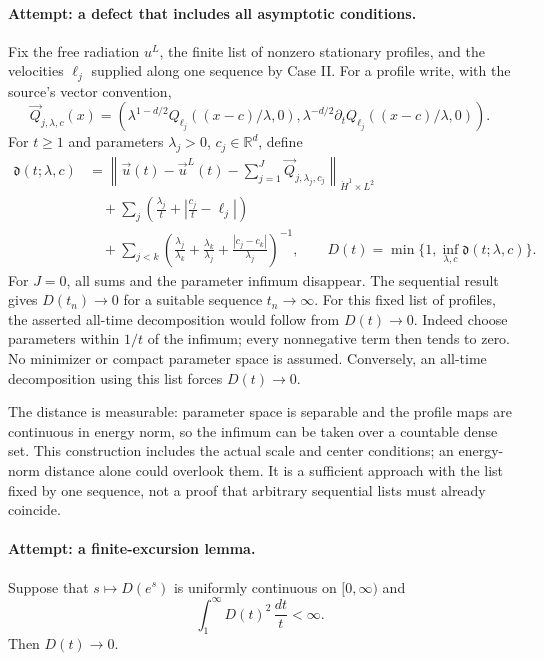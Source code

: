 \documentclass[11pt,a4paper]{article}
\newcommand{\R}{\mathbb{R}}
\numberwithin{equation}{section}
\begin{document}
\paragraph{Attempt: a defect that includes all asymptotic conditions.}
Fix the free radiation $u^L$, the finite list of nonzero stationary profiles,
and the velocities $\ell_j$ supplied along one sequence by Case II.
For a profile write, with the source's vector convention,
\[
 \vec Q_{j,\lambda,c}(x)=
 \left(\lambda^{1-d/2}Q_{\ell_j}((x-c)/\lambda,0),
       \lambda^{-d/2}\partial_tQ_{\ell_j}((x-c)/\lambda,0)\right).
\]
For $t\ge1$ and parameters $\lambda_j>0$, $c_j\in\R^d$, define
\begin{align*}
 \mathfrak d(t;\lambda,c)
 &=\left\|\vec u(t)-\vec u^L(t)-\sum_{j=1}^J
                              \vec Q_{j,\lambda_j,c_j}\right\|_{\dot H^1\times L^2}\\
 &\quad+\sum_j\left(\frac{\lambda_j}{t}
                         +\left|\frac{c_j}{t}-\ell_j\right|\right)\\
 &\quad+\sum_{j<k}
 \left(\frac{\lambda_j}{\lambda_k}+\frac{\lambda_k}{\lambda_j}
                   +\frac{|c_j-c_k|}{\lambda_j}\right)^{-1},
 \qquad D(t)=\min\{1,\inf_{\lambda,c}\mathfrak d(t;\lambda,c)\}.
\end{align*}
For $J=0$, all sums and the parameter infimum disappear. The sequential
result gives $D(t_n)\to0$ for a suitable sequence $t_n\to\infty$.
For this fixed list of profiles, the asserted all-time decomposition would
follow from $D(t)\to0$. Indeed choose parameters within $1/t$ of the
infimum; every nonnegative term then tends to zero. No minimizer or compact
parameter space is assumed. Conversely, an all-time decomposition using
this list forces $D(t)\to0$.

The distance is measurable: parameter space is separable and the profile
maps are continuous in energy norm, so the infimum can be taken over a
countable dense set. This construction includes the actual scale and
center conditions; an energy-norm distance alone could overlook them.
It is a sufficient approach with the list fixed by one sequence, not a
proof that arbitrary sequential lists must already coincide.

\paragraph{Attempt: a finite-excursion lemma.}
Suppose that $s\mapsto D(e^s)$ is uniformly continuous on $[0,\infty)$
and
\begin{equation}\label{eq177-integral}
                         \int_1^\infty D(t)^2\,\frac{dt}{t}<\infty.
\end{equation}
Then $D(t)\to0$.
\end{document}
